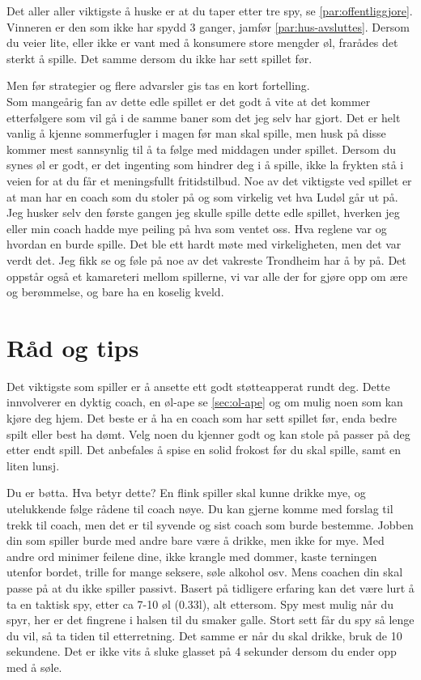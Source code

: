 \documentclass[10pt,a4paper,norsk,openany]{book}
\begin{document}
Det aller aller viktigste å huske er at du taper etter tre spy, se
\cref{par:offentliggjore}. Vinneren er den som ikke har spydd 3 ganger, jamfør
\cref{par:hus-avsluttes}. Dersom du veier lite, eller ikke er vant med å
konsumere store mengder øl, frarådes det sterkt å spille. Det samme dersom du
ikke har sett spillet før. 

Men før strategier og flere advarsler gis tas en kort
fortelling. \\ Som mangeårig fan av dette edle spillet er det godt å vite at det
kommer etterfølgere som vil gå i de samme baner som det jeg selv har gjort. Det
er helt vanlig å kjenne sommerfugler i magen før man skal spille, men husk på
disse kommer mest sannsynlig til å ta følge med middagen under spillet. Dersom
du synes øl er godt, er det ingenting som hindrer deg i å spille, ikke la
frykten stå i veien for at du får et meningsfullt fritidstilbud. Noe av det
viktigste ved spillet er at man har en coach som du stoler på og som virkelig
vet hva Ludøl går ut på. Jeg husker selv den første gangen jeg skulle spille
dette edle spillet, hverken jeg eller min coach hadde mye peiling på hva som
ventet oss. Hva reglene var og hvordan en burde spille. Det ble ett hardt møte
med virkeligheten, men det var verdt det. Jeg fikk se og føle på noe av det
vakreste Trondheim har å by på. Det oppstår også et kamareteri mellom spillerne,
vi var alle der for gjøre opp om ære og berømmelse, og bare ha en koselig kveld.


\section{Råd og tips}

Det viktigste som spiller er å ansette ett godt støtteapperat rundt deg. Dette
innvolverer en dyktig coach, en øl-ape se \cref{sec:ol-ape} og om mulig noen som
kan kjøre deg hjem. Det beste er å ha en coach som har sett spillet før, enda
bedre spilt eller best ha dømt. Velg noen du kjenner godt og kan stole på passer
på deg etter endt spill. Det anbefales å spise en solid frokost før du skal
spille, samt en liten lunsj.

Du er bøtta. Hva betyr dette? En flink spiller skal kunne drikke mye, og
utelukkende følge rådene til coach nøye. Du kan gjerne komme med forslag til
trekk til coach, men det er til syvende og sist coach som burde bestemme. Jobben
din som spiller burde med andre bare være å drikke, men ikke for mye. Med andre
ord minimer feilene dine, ikke krangle med dommer, kaste terningen utenfor
bordet, trille for mange seksere, søle alkohol osv. Mens coachen din skal passe
på at du ikke spiller passivt. Basert på tidligere erfaring kan det være lurt å
ta en taktisk spy, etter ca 7-10 øl (0.33l), alt ettersom. Spy mest mulig når du
spyr, her er det fingrene i halsen til du smaker galle. Stort sett får du spy så
lenge du vil, så ta tiden til etterretning. Det samme er når du skal drikke,
bruk de 10 sekundene. Det er ikke vits å sluke glasset på 4 sekunder dersom du
ender opp med å søle. \medskip
\end{document}
